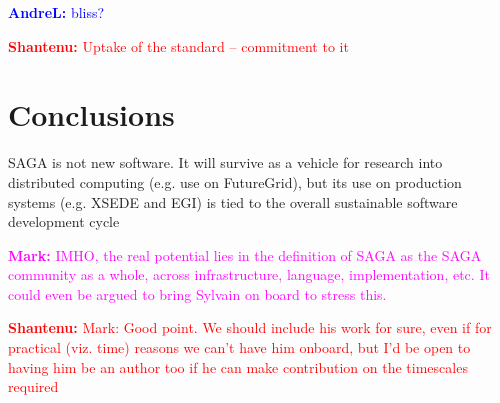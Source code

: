 \documentclass{article}
\newcommand{\B}[1]{\textbf{#1}}
\newcommand{\jhanote}[1]{{\textcolor{red}{     \B{Shantenu:} #1 }}}
\newcommand{\alnote}[1]{{\textcolor{blue}{    \B{AndreL:  } #1 }}}
\newcommand{\msnote}[1]{{\textcolor{magenta}{ \B{Mark:    } #1 }}}
\newcommand{\hknote}[1]{{\textcolor{red}{  \B{Hartmut: } #1 }}}
\newcommand{\jhanote}[1]{}
\newcommand{\alnote}[1]{}
\newcommand{\msnote}[1]{}
\newcommand{\hknote}[1]{}
\begin{document}

  \alnote{bliss?}


  \jhanote{Uptake of the standard -- commitment to it}



\section{Conclusions}
\label{sec:conclusions}

SAGA is not new software. It will survive as a vehicle for research
into distributed computing (e.g. use on FutureGrid), but
its use on production systems (e.g. XSEDE and EGI) is tied to the 
overall sustainable software development cycle

 \msnote{IMHO, the real potential lies in the definition of SAGA as the SAGA
 community as a whole, across infrastructure, language, implementation, etc.  It
 could even be argued to bring Sylvain on board to stress this.}

 \jhanote{Mark: Good point. We should include his work for sure, even if for
 practical (viz. time) reasons we can't have him onboard, but I'd be open to
 having him be an author too if he can make contribution on the timescales
 required}
\end{document}
